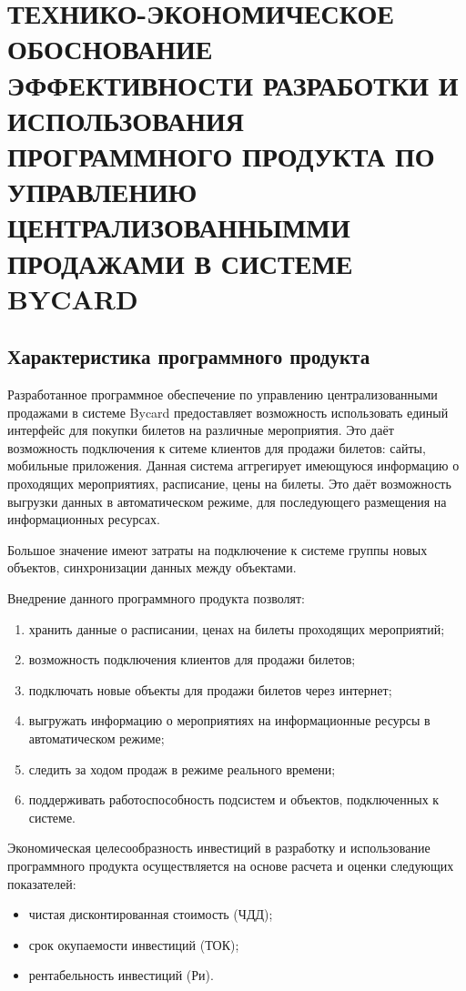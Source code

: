 \section{ТЕХНИКО-ЭКОНОМИЧЕСКОЕ ОБОСНОВАНИЕ ЭФФЕКТИВНОСТИ РАЗРАБОТКИ И ИСПОЛЬЗОВАНИЯ ПРОГРАММНОГО ПРОДУКТА ПО УПРАВЛЕНИЮ ЦЕНТРАЛИЗОВАННЫММИ ПРОДАЖАМИ В СИСТЕМЕ BYCARD}

\subsection{Характеристика программного продукта}
Разработанное программное обеспечение по управлению централизованными продажами в системе Bycard предоставляет возможность использовать единый интерфейс для покупки билетов на различные мероприятия. Это даёт возможность подключения к ситеме клиентов для продажи билетов: сайты, мобильные приложения. Данная система аггрегирует имеющуюся информацию о проходящих мероприятиях, расписание, цены на билеты. Это даёт возможность выгрузки данных в автоматическом режиме, для последующего размещения на информационных ресурсах.

Большое значение имеют затраты на подключение к системе группы новых объектов, синхронизации данных между объектами.

Внедрение данного программного продукта позволят:
\begin{enumerate}
    \item хранить данные о расписании, ценах на билеты проходящих мероприятий;
    \item возможность подключения клиентов для продажи билетов;
    \item подключать новые объекты для продажи билетов через интернет;
    \item выгружать информацию о мероприятиях на информационные ресурсы в автоматическом режиме;
    \item следить за ходом продаж в режиме реального времени;
    \item поддерживать работоспособность подсистем и объектов, подключенных к системе.
\end{enumerate}

Экономическая целесообразность инвестиций в разработку и использование программного продукта осуществляется на основе расчета и оценки следующих показателей:
\begin{itemize}
    \item чистая  дисконтированная стоимость (ЧДД);
    \item срок окупаемости инвестиций (ТОК);
    \item рентабельность инвестиций (Ри).
\end{itemize}


